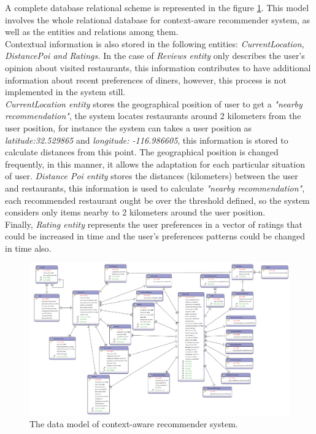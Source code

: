A complete database relational scheme is represented in the figure
\ref{fig:datamodel}. This model involves the whole relational database for
context-aware recommender system, as well as the entities and
relations among them. \\
Contextual information is also stored in the following entities:
\textit{CurrentLocation, DistancePoi and Ratings.} 
In the case of \textit{Reviews entity}  only describes the user's 
opinion about visited restaurants, this information contributes to 
have additional information about recent preferences of diners, 
however, this process is not implemented in the system still. \\
\textit{CurrentLocation entity} stores the geographical position of
user to get a \textit{"nearby recommendation"}, the system locates
restaurants around 2 kilometers from the user position, for instance
the system can takes a user position as \textit{latitude:32.529865}
and \textit{longitude: -116.986605}, this information is stored to
calculate distances from this point. The geographical position is
changed frequently, in this manner, it allows the adaptation for each
particular situation of user. \textit{Distance Poi entity} stores the
distances (kilometers) between the user and restaurants, this
information is used to calculate \textit{"nearby recommendation"},
each recommended restaurant ought be over the threshold defined, 
so the system considers only items nearby to 2 kilometers 
around the user position.\\
Finally, \textit{Rating entity} represents the user preferences  
in a vector of ratings that could be increased in time and  
the user's preferences patterns could be changed in time also.
\begin{landscape} 
\begin{figure}[!h] 
\captionsetup{font=footnotesize}
\centering
\includegraphics[width=1.3\textwidth]{img/recomet.png}
\caption{The data model of context-aware recommender system.}
\label{fig:datamodel}    
\end{figure}
\end{landscape}

